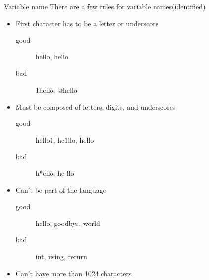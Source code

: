 \documentclass[xcolor={dvipsnames}]{beamer}
\begin{document}
\begin{frame}{Variable name}
	There are a few rules for variable names(identified)
	\begin{itemize}
		\pause
		\item First character has to be a letter or underscore
			\begin{description}
				\item[good] hello, \textunderscore hello
				\item[bad] 1hello, @hello
			\end{description}
		\pause
		\item Must be composed of letters, digits, and underscores
			\begin{description}
				\item[good] hello1, he1llo, he\textunderscore llo
				\item[bad] h*ello, he llo
			\end{description}
		\pause
		\item Can't be part of the language
				\begin{description}
				\item[good] hello, goodbye, world
				\item[bad] int, using, return
			\end{description}
		\pause
		\item Can't have more than 1024 characters 
	\end{itemize}	
\end{frame}
\end{document}
